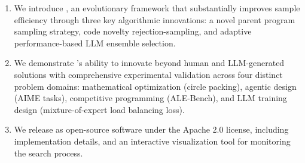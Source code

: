 \begin{enumerate}
    \item We introduce \ouralgo, an evolutionary framework that substantially improves sample efficiency through three key algorithmic innovations: a novel parent program sampling strategy, code novelty rejection-sampling, and adaptive performance-based LLM ensemble selection.
    \item We demonstrate \ouralgo's ability to innovate beyond human and LLM-generated solutions with comprehensive experimental validation across four distinct problem domains: mathematical optimization (circle packing), agentic design (AIME tasks), competitive programming (ALE-Bench), and LLM training design (mixture-of-expert load balancing loss). 
    \item We release \ouralgo as open-source software under the Apache 2.0 license, including implementation details, and an interactive visualization tool for monitoring the search process.
\end{enumerate}

